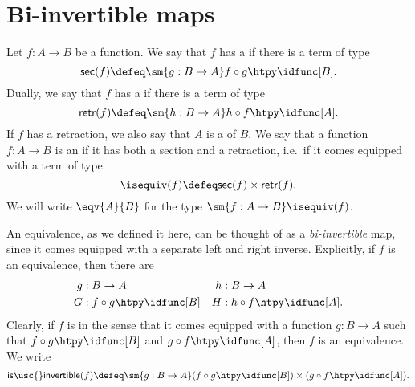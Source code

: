 \section{Bi-invertible maps}
\begin{defn}
Let $f:A\to B$ be a function. We say that $f$ has a  if there is a term of type
\begin{equation*}
\mathsf{sec}(f) \defeq \sm{g:B\to A} f\circ g\htpy \idfunc[B].
\end{equation*}
Dually, we say that $f$ has a  if there is a term of type
\begin{equation*}
\mathsf{retr}(f) \defeq \sm{h:B\to A} h\circ f\htpy \idfunc[A].
\end{equation*}
If $f$ has a retraction, we also say that $A$ is a  of $B$.
We say that a function $f:A\to B$ is an  if it has both a section and a retraction, i.e.~if it comes equipped with a term of type
\begin{equation*}
\isequiv(f)\defeq\mathsf{sec}(f)\times\mathsf{retr}(f).
\end{equation*}
We will write $\eqv{A}{B}$ for the type $\sm{f:A\to B}\isequiv(f)$.
\end{defn}

\begin{rmk}
An equivalence, as we defined it here, can be thought of as a \emph{bi-invertible} map, since it comes equipped with a separate left and right inverse. Explicitly, if $f$ is an equivalence, then there are
\begin{align*}
g & : B\to A & h & : B\to A \\
G & : f\circ g \htpy \idfunc[B] & H & : h\circ f \htpy \idfunc[A].
\end{align*}
Clearly, if $f$ is  in the sense that it comes equipped with a function $g:B\to A$ such that $f\circ g\htpy\idfunc[B]$ and $g\circ f\htpy\idfunc[A]$, then $f$ is an equivalence. We write
\begin{equation*}
\mathsf{is\usc{}invertible}(f)\defeq\sm{g:B\to A} (f\circ g\htpy \idfunc[B])\times (g\circ f\htpy\idfunc[A]).
\end{equation*}
\end{rmk}

